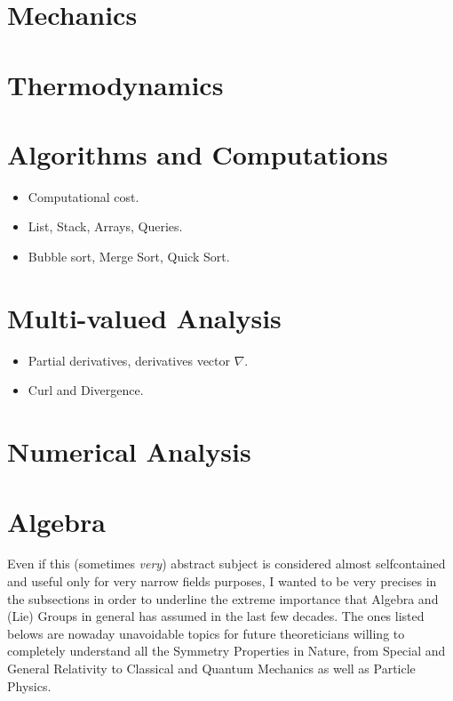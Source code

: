\documentclass[10pt]{article}
\begin{document}
\section{Mechanics}

\section{Thermodynamics}

\section{Algorithms and Computations}
\begin{itemize}
	\item Computational cost.
	\item List, Stack, Arrays, Queries.
	\item Bubble sort, Merge Sort, Quick Sort.
\end{itemize}
\section{Multi-valued Analysis}
\begin{itemize}
	\item Partial derivatives, derivatives vector $ \nabla $.
	\item Curl and Divergence. 
\end{itemize}
\section{Numerical Analysis}
\section{Algebra}
Even if this (sometimes \emph{very}) abstract subject is considered almost selfcontained and useful only for very narrow fields purposes, I wanted to be very precises in the subsections in order to underline the extreme importance that Algebra and (Lie) Groups in general has assumed in the last few decades. The ones listed belows are nowaday unavoidable topics for future theoreticians willing to completely understand all the Symmetry Properties in Nature, from Special and General Relativity to Classical and Quantum Mechanics as well as Particle Physics. 
\end{document}
